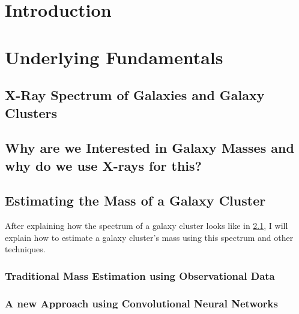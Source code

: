 \documentclass[12pt]{article}
\numberwithin{equation}{subsection}
\begin{document}
\newpage
\tableofcontents

\newpage


    
\section{Introduction}
\label{intro}

\newpage

\section{Underlying Fundamentals}
\label{Fundamentals}


\subsection{X-Ray Spectrum of Galaxies and Galaxy Clusters}
\label{x-ray}


\subsection{Why are we Interested in Galaxy Masses and why do we use X-rays for this?}

\subsection{Estimating the Mass of a Galaxy Cluster}
After explaining how the spectrum of a galaxy cluster looks like in \cref{x-ray}, I will explain how to estimate a galaxy cluster's mass using this spectrum and other techniques.
\subsubsection{Traditional Mass Estimation using Observational Data}
\label{mass_est}

\subsubsection{A new Approach using Convolutional Neural Networks}
\label{new_approach}

\end{document}
